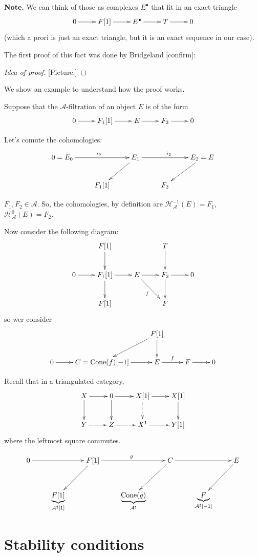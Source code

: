 \noindent
{\bf Note.} We can think of those as
complexes $E ^\bullet$ that fit in an exact
triangle
$$
\xymatrix{
0\ar[r]&F[1]\ar[r]&E^\bullet\ar[r]&T\ar[r]&0
}
$$
(which a prori is just an exact triangle, but
it is an exact sequence in our case).

The first proof of this fact was done by
Bridgeland [confirm]:

\begin{proof}[Idea of proof]
[Picture.]
\end{proof}

We show an example to understand how the
proof works.

\begin{example}
\label{example-}
Suppose that the $\mathcal{A}$-filtration of
an object $E$ is of the form
$$
\xymatrix{
0\ar[r]&F_1[1]\ar[r]&E\ar[r]&F_2\ar[r]&0
}
$$

Let's comute the cohomologies:
$$
\xymatrix{
0=E_0\ar[rr]^{i_0}&&E_1\ar[dl]\ar[rr]^{i_2}&&
E_2=E\ar[dl]\\
&F_1[1]&  & F_2
}
$$

$F_1,F_2 \in \mathcal{A}$. So, the
cohomologies, by definition are
$\mathcal{H}_{\mathcal{A}}^{-1}(E)=F_1$,
$\mathcal{H}_{\mathcal{A}}^0(E)=F_2$.

Now consider the following diagram:
$$
\xymatrix{
&  F[1]\ar[d]&  &  T\ar[d]\\
0 \ar[r]&  F_1[1]\ar[d]\ar[r]&  E
\ar[r]\ar[rd]_f&  F_2\ar[d]\ar[r]& 0\\
& F[1]& & F
}
$$
so wer consider
$$
\xymatrix{
& & F[1]\ar[dl]\ar[d]\\
0\ar[r]&C=\text{Cone}(f)[-1]\ar[r]&E\ar[r]^f&
F\ar[r]&0
}
$$
\end{example}

Recall that in a triangulated category,
$$
\xymatrix{
X\ar[d]\ar[r]&  0 \ar[d]\ar[r]&
X[1]\ar@{.>}[d]\ar[r]& X[1]\ar[d]\\
Y\ar[r]& Z\ar[r]& X^1\ar[r]&Y[1]
}
$$
where the leftmost square commutes.

$$
\xymatrix{
0\ar[rr]&&F[1]\ar[dl]\ar[rr]^{g}&  &  C
\ar[dl]\ar[rr]&  &  E\ar[dl]\\
&  \underbrace{F[1]}_{\mathcal{A}^\sharp[1]}&
&
\underbrace{\text{Cone}(g)}_{\mathcal{A}
^\sharp}&
&
\underbrace{F}_{\mathcal{A}^\sharp[-1]}
}
$$

\section{Stability conditions}
\label{section-stability-conditions}

